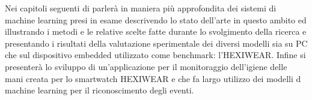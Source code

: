 Nei capitoli seguenti di parlerà in maniera più approfondita dei sistemi di machine learning presi in esame descrivendo lo stato dell'arte in questo ambito ed illustrando i metodi e le relative scelte fatte 
durante lo svolgimento della ricerca e presentando i risultati della valutazione sperimentale dei diversi modelli sia su PC che sul dispositivo embedded utilizzato come benchmark: l'HEXIWEAR. Infine si presenterà 
lo sviluppo di un'applicazione per il monitoraggio dell'igiene delle mani creata per lo smartwatch HEXIWEAR e che fa largo utilizzo dei modelli d machine learning per il riconoscimento degli eventi.